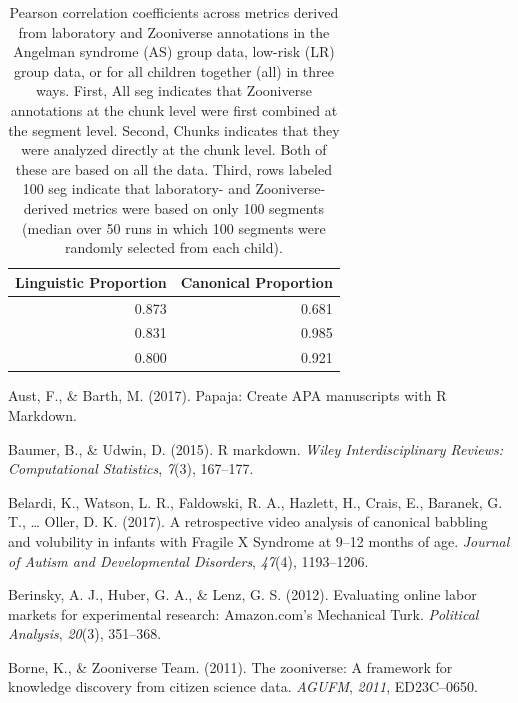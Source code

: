 \documentclass[english,,man]{apa6}
\begin{document}
\begin{table}

\caption{\label{tab:tab-cors}Pearson correlation coefficients across metrics derived from laboratory and Zooniverse annotations in the Angelman syndrome (AS) group data, low-risk (LR) group data, or for all children together (all) in three ways. First, All seg indicates that Zooniverse annotations at the chunk level were first combined at the segment level. Second, Chunks indicates that they were analyzed directly at the chunk level. Both of these are based on all the data. Third, rows labeled 100 seg indicate that laboratory- and Zooniverse-derived metrics were based on only 100 segments (median over 50 runs in which 100 segments were randomly selected from each child).}
\centering
\begin{tabular}[t]{r|r}
\hline
Linguistic Proportion & Canonical Proportion\\
\hline
0.873 & 0.681\\
\hline
0.831 & 0.985\\
\hline
0.800 & 0.921\\
\hline
\end{tabular}
\end{table}

\hypertarget{refs}{}
\leavevmode\hypertarget{ref-aust2017papaja}{}%
Aust, F., \& Barth, M. (2017). Papaja: Create APA manuscripts with R Markdown.

\leavevmode\hypertarget{ref-baumer2015r}{}%
Baumer, B., \& Udwin, D. (2015). R markdown. \emph{Wiley Interdisciplinary Reviews: Computational Statistics}, \emph{7}(3), 167--177.

\leavevmode\hypertarget{ref-belardi2017retrospective}{}%
Belardi, K., Watson, L. R., Faldowski, R. A., Hazlett, H., Crais, E., Baranek, G. T., \ldots{} Oller, D. K. (2017). A retrospective video analysis of canonical babbling and volubility in infants with Fragile X Syndrome at 9--12 months of age. \emph{Journal of Autism and Developmental Disorders}, \emph{47}(4), 1193--1206.

\leavevmode\hypertarget{ref-berinsky2012evaluating}{}%
Berinsky, A. J., Huber, G. A., \& Lenz, G. S. (2012). Evaluating online labor markets for experimental research: Amazon.com's Mechanical Turk. \emph{Political Analysis}, \emph{20}(3), 351--368.

\leavevmode\hypertarget{ref-borne2011zooniverse}{}%
Borne, K., \& Zooniverse Team. (2011). The zooniverse: A framework for knowledge discovery from citizen science data. \emph{AGUFM}, \emph{2011}, ED23C--0650.
\end{document}
